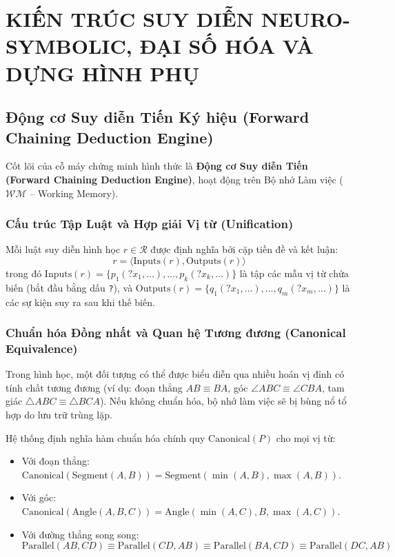 
\chapter{KIẾN TRÚC SUY DIỄN NEURO-SYMBOLIC, ĐẠI SỐ HÓA VÀ DỰNG HÌNH PHỤ}
\label{chap:reasoning}

\section{Động cơ Suy diễn Tiến Ký hiệu (Forward Chaining Deduction Engine)}
Cốt lõi của cỗ máy chứng minh hình thức là \textbf{Động cơ Suy diễn Tiến (Forward Chaining Deduction Engine)}, hoạt động trên Bộ nhớ Làm việc ($\mathcal{WM}$ -- Working Memory).

\subsection{Cấu trúc Tập Luật và Hợp giải Vị từ (Unification)}
Mỗi luật suy diễn hình học $r \in \mathcal{R}$ được định nghĩa bởi cặp tiền đề và kết luận:
\begin{equation}
    r = \langle \text{Inputs}(r), \text{Outputs}(r) \rangle
\end{equation}
trong đó $\text{Inputs}(r) = \{p_1(?x_1, \dots), \dots, p_k(?x_k, \dots)\}$ là tập các mẫu vị từ chứa biến (bắt đầu bằng dấu \texttt{?}), và $\text{Outputs}(r) = \{q_1(?x_1, \dots), \dots, q_m(?x_m, \dots)\}$ là các sự kiện suy ra sau khi thế biến.

\subsection{Chuẩn hóa Đồng nhất và Quan hệ Tương đương (Canonical Equivalence)}
Trong hình học, một đối tượng có thể được biểu diễn qua nhiều hoán vị đỉnh có tính chất tương đương (ví dụ: đoạn thẳng $AB \equiv BA$, góc $\angle ABC \equiv \angle CBA$, tam giác $\triangle ABC \equiv \triangle BCA$). Nếu không chuẩn hóa, bộ nhớ làm việc sẽ bị bùng nổ tổ hợp do lưu trữ trùng lặp.

Hệ thống định nghĩa hàm chuẩn hóa chính quy $\text{Canonical}(P)$ cho mọi vị từ:
\begin{itemize}
    \item Với đoạn thẳng: $\text{Canonical}(\text{Segment}(A, B)) = \text{Segment}(\min(A, B), \max(A, B))$.
    \item Với góc: $\text{Canonical}(\text{Angle}(A, B, C)) = \text{Angle}(\min(A, C), B, \max(A, C))$.
    \item Với đường thẳng song song:
    $$\text{Parallel}(AB, CD) \equiv \text{Parallel}(CD, AB) \equiv \text{Parallel}(BA, CD) \equiv \text{Parallel}(DC, AB)$$
\end{itemize}

